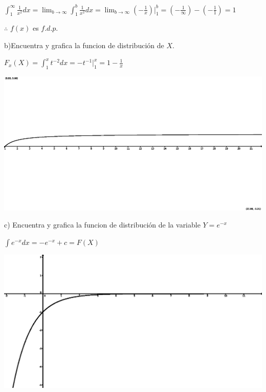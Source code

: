 \documentclass{article}
\begin{document}
        $\displaystyle\int_{1}^\infty \frac{1}{x^2} dx = \lim_{b \to \infty}\displaystyle\int_1^b \frac{1}{x^2} dx = \lim_{b \to \infty} (-\frac{1}{x})|_1^b=(-\frac{1}{\infty})-(-\frac{1}{1}) = 1$\vspace{.1cm}

        $\therefore$ $f(x)$ es $f.d.p.$\vspace{.2cm}

        b)Encuentra y grafica la funcion de distribución de $X$. \vspace{.1cm}

        \vspace{.1cm}

        $F_x(X)=\displaystyle\int_1^x t^{-2} dx=-t^{-1}|_1^x=1-\frac{1}{x}$\vspace{.1cm}

        \begin{center}
            \includegraphics[scale=0.4]{graf.eps}   
        \end{center}

        c) Encuentra y grafica la funcion de distribución de la variable 
        $Y = e^{-x}$\vspace{.1cm}

        \vspace{.1cm}

        $\int e^{-x} dx= -e^{-x}+c = F(X)$\vspace{.1cm}

        \begin{center}
            \includegraphics[scale=0.4]{grafs.eps}   
        \end{center}
\end{document}
